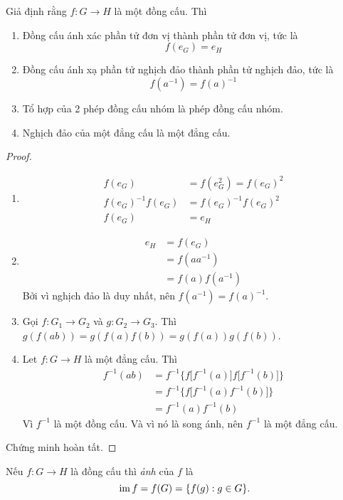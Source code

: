 \begin{prop}
  Giả định rằng $f: G\rightarrow H$ là một đồng cấu. Thì
  \begin{enumerate}
    \item Đồng cấu ánh xác phần tử đơn vị thành phần tử đơn vị, tức là
      \[
        f(e_G) = e_H
      \]
    \item Đồng cấu ánh xạ phần tử nghịch đảo thành phần tử nghịch đảo, tức là
      \[
        f(a^{-1}) = f(a)^{-1}
      \]
    \item Tổ hợp của 2 phép đồng cấu nhóm là phép đồng cấu nhóm.
    \item Nghịch đảo của một đẳng cấu là một đẳng cấu.
  \end{enumerate}
\end{prop}
\begin{proof}\leavevmode
  \begin{enumerate}
    \item \begin{align*}
        f(e_G) &= f(e_G^2) = f(e_G)^2\\
        f(e_G)^{-1}f(e_G) &= f(e_G)^{-1}f(e_G)^2\\
        f(e_G) &= e_H
      \end{align*}
    \item \begin{align*}
        e_H &= f(e_G)\\
        &= f(aa^{-1})\\
        &= f(a)f(a^{-1})
      \end{align*}
      Bởi vì nghịch đảo là duy nhất, nên $f(a^{-1}) = f(a)^{-1}$.
    \item Gọi $f:G_1 \rightarrow G_2$ và $g:G_2 \rightarrow G_3$. Thì $g(f(ab)) = g(f(a)f(b)) = g(f(a))g(f(b))$.
    \item Let $f:G \rightarrow H$ là một đẳng cấu. Thì
      \begin{align*}
        f^{-1}(ab) &= f^{-1}\Big\{f\big[f^{-1}(a)\big]f\big[f^{-1}(b)\big]\Big\}\\
        &= f^{-1}\Big\{f\big[f^{-1}(a)f^{-1}(b)\big]\Big\}\\
        &= f^{-1}(a)f^{-1}(b)
      \end{align*}
      Vì $f^{-1}$ là một đồng cấu. Và vì nó là song ánh, nên $f^{-1}$ là một đẳng cấu.\qedhere
  \end{enumerate}
  Chứng minh hoàn tất.
\end{proof}

\begin{defi}
  Nếu $f:G\rightarrow H$ là đồng cấu thì \emph{ảnh} của $f$ là
  \[
    \operatorname{im} f = f(G) = \{f(g):g\in G\}.
  \]
\end{defi}

